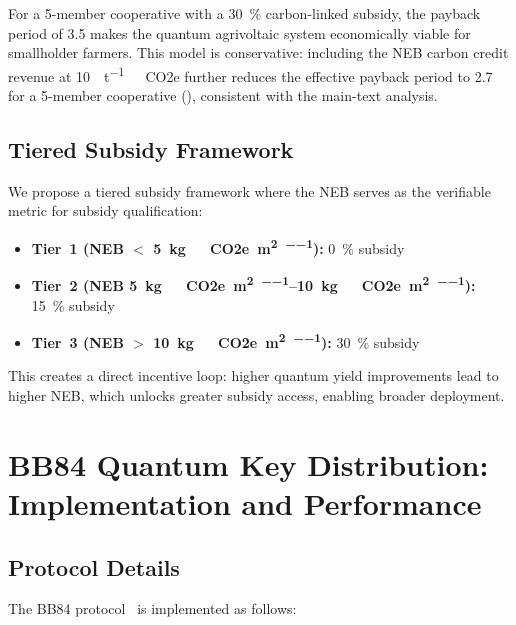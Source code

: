 \documentclass[11pt,a4paper]{article}
\begin{document}
For a 5-member cooperative with a \SI{30}{\percent} carbon-linked subsidy, the payback period of \SI{3.5}{\yr} makes the quantum agrivoltaic system economically viable for smallholder farmers.
This model is conservative: including the NEB carbon credit revenue at \SI{10}{\USD\per\tonne\ CO2e} further reduces the effective payback period to \SI{2.7}{\yr} for a 5-member cooperative (), consistent with the main-text analysis.

\subsection{Tiered Subsidy Framework}

We propose a tiered subsidy framework where the NEB serves as the verifiable metric for subsidy qualification:

\begin{itemize}
\item \textbf{Tier~1 (NEB $<$ \SI{5}{\kg\ CO2e\per\m\squared\per\yr}):} \SI{0}{\percent} subsidy
\item \textbf{Tier~2 (NEB \SIrange{5}{10}{\kg\ CO2e\per\m\squared\per\yr}):} \SI{15}{\percent} subsidy
\item \textbf{Tier~3 (NEB $>$ \SI{10}{\kg\ CO2e\per\m\squared\per\yr}):} \SI{30}{\percent} subsidy
\end{itemize}

This creates a direct incentive loop: higher quantum yield improvements lead to higher NEB, which unlocks greater subsidy access, enabling broader deployment.


\section{BB84 Quantum Key Distribution: Implementation and Performance}
\label{SI-sec:qkd}

\subsection{Protocol Details}

The BB84 protocol~\cite{Bennett1984} is implemented as follows:
\end{document}

